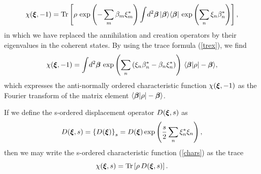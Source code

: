 \documentclass[12pt]{article}
\def\beq{\begin{equation}}
\def\eeq{\end{equation}}
\def\b{\beta}
\def\bb{{\mbox{\boldmath$\beta$}}}
\def\sb{\beta^*}
\def\x{\xi}
\def\bx{{\mbox{\boldmath$\xi$}}}
\def\xs{\xi^*}
\def\Tr{{\rm Tr}}
\def\ops{operators }
\def\ani{annihilation }
\def\cre{creation }
\begin{document}
\beq
\chi ( \bx , -1 ) = \Tr \left[
\rho
\, \exp\left( - \sum_m \b_m \xs_m \right)
\int \! d^2 \bb \, | \bb \rangle \langle \bb |
\, \exp\left( \sum_n \x_n \sb_n \right)
\right] ,
\eeq
in which we have replaced the \ani and \cre \ops
by their eigenvalues in the coherent states.
By using the trace formula (\ref {trex}), we find
\beq
\chi ( \bx , -1 ) = \int \! d^2 \bb \, 
\exp\left( \sum_n \left( \x_n \sb_n - \b_n \xs_n \right) \right) \,
\langle \bb | \rho | - \bb \rangle ,
\label {chiaft}
\eeq
which expresses the anti-normally ordered characteristic function
$ \chi ( \bx , -1 ) $ as the Fourier transform of the matrix element 
$ \langle \bb | \rho | - \bb \rangle $.
\par
If we define the s-ordered displacement operator
$ D ( \bx , s ) $ as  
\beq
D ( \bx , s ) = \left\{ D ( \bx ) \right\}_s 
= D ( \bx ) \exp \left( \frac{ s }{ 2 }
\sum_n \xs_n \x_n \right) ,
\label {Dbxs}
\eeq
then we may write the s-ordered characteristic function (\ref {chars}) 
as the trace
\beq
\chi ( \bx , s ) = \Tr \left[
\rho
\, D ( \bx , s ) \right] .
\label {chibxsDbxs}
\eeq
\end{document}
